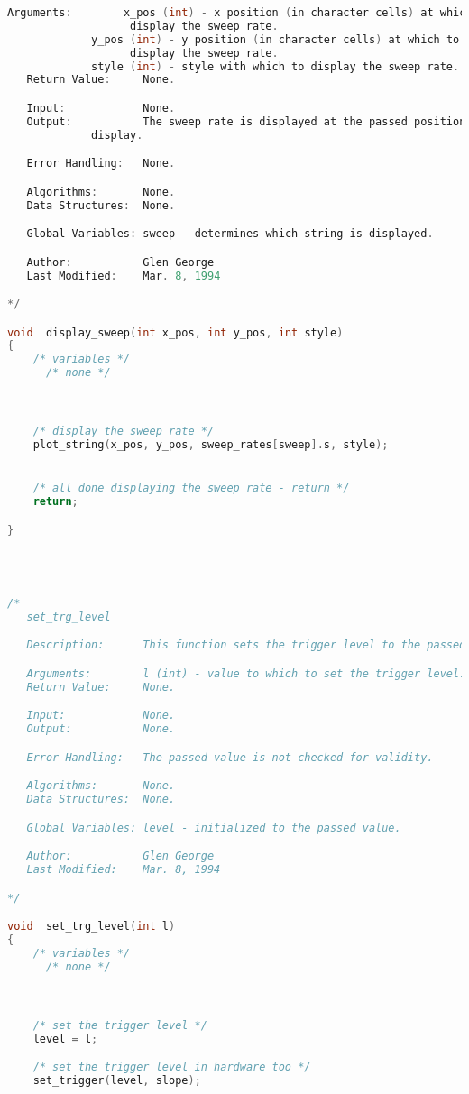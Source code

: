 \begin{lstlisting}[language=C]
   Arguments:        x_pos (int) - x position (in character cells) at which to
   				   display the sweep rate.
   		     y_pos (int) - y position (in character cells) at which to
   				   display the sweep rate.
		     style (int) - style with which to display the sweep rate.
   Return Value:     None.

   Input:            None.
   Output:           The sweep rate is displayed at the passed position on the
   		     display.

   Error Handling:   None.

   Algorithms:       None.
   Data Structures:  None.

   Global Variables: sweep - determines which string is displayed.

   Author:           Glen George
   Last Modified:    Mar. 8, 1994

*/

void  display_sweep(int x_pos, int y_pos, int style)
{
    /* variables */
      /* none */



    /* display the sweep rate */
    plot_string(x_pos, y_pos, sweep_rates[sweep].s, style);


    /* all done displaying the sweep rate - return */
    return;

}




/*
   set_trg_level

   Description:      This function sets the trigger level to the passed value.

   Arguments:        l (int) - value to which to set the trigger level.
   Return Value:     None.

   Input:            None.
   Output:           None.

   Error Handling:   The passed value is not checked for validity.

   Algorithms:       None.
   Data Structures:  None.

   Global Variables: level - initialized to the passed value.

   Author:           Glen George
   Last Modified:    Mar. 8, 1994

*/

void  set_trg_level(int l)
{
    /* variables */
      /* none */



    /* set the trigger level */
    level = l;

    /* set the trigger level in hardware too */
    set_trigger(level, slope);



\end{lstlisting}
